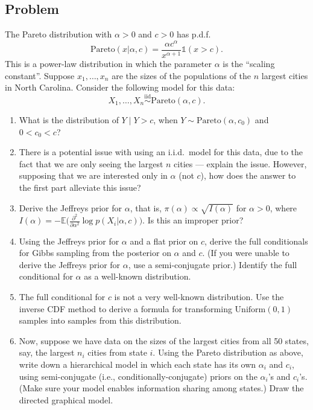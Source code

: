 \documentclass[11pt]{article}
\newcommand{\Pareto}{\mathrm{Pareto}}
\newcommand{\Uniform}{\mathrm{Uniform}}
\newcommand{\I}{\mathds{1}}
\begin{document}
\subsection*{Problem}

The Pareto distribution with $\alpha>0$ and $c>0$ has p.d.f.\
$$ \Pareto(x|\alpha,c) = \frac{\alpha c^\alpha}{x^{\alpha+1}}\I(x>c). $$
This is a power-law distribution in which the parameter $\alpha$ is the ``scaling constant''.
Suppose $x_1,\ldots,x_n$ are the sizes of the populations of the $n$ largest cities in North Carolina. 
Consider the following model for this data:
$$ X_1,\ldots,X_n \overset{\text{iid}}{\sim} \Pareto(\alpha,c). $$
\begin{enumerate}
\item What is the distribution of $Y\mid Y>c$, when $Y\sim\Pareto(\alpha,c_0)$ and $0<c_0<c$?  
\item There is a potential issue with using an i.i.d.\ model for this data, due to the fact that we are only seeing the largest $n$ cities
    --- explain the issue.  However, supposing that we are interested only in $\alpha$ (not $c$),
    how does the answer to the first part alleviate this issue?
\item Derive the Jeffreys prior for $\alpha$, that is, $\pi(\alpha) \propto \sqrt{I(\alpha)}$ for $\alpha>0$, where
    $I(\alpha) = -\mathds{E}\big(\frac{\partial^2}{\partial\alpha^2} \log p(X_i|\alpha,c)\big)$. Is this an improper prior?
\item Using the Jeffreys prior for $\alpha$ and a flat prior on $c$, derive the full conditionals for Gibbs sampling
    from the posterior on $\alpha$ and $c$.  (If you were unable to derive the Jeffreys prior for $\alpha$, use a semi-conjugate prior.)
    Identify the full conditional for $\alpha$ as a well-known distribution.
\item The full conditional for $c$ is not a very well-known distribution.  Use the inverse CDF method to derive a 
    formula for transforming $\Uniform(0,1)$ samples into samples from this distribution.
\item Now, suppose we have data on the sizes of the largest cities from all 50 states, say, the largest $n_i$ cities from state $i$.
    Using the Pareto distribution as above, write down a hierarchical model in which each state has its own $\alpha_i$ and $c_i$,
    using semi-conjugate (i.e., conditionally-conjugate) priors on the $\alpha_i$'s and $c_i$'s.
    (Make sure your model enables information sharing among states.) Draw the directed graphical model.
\end{enumerate}
\end{document}
